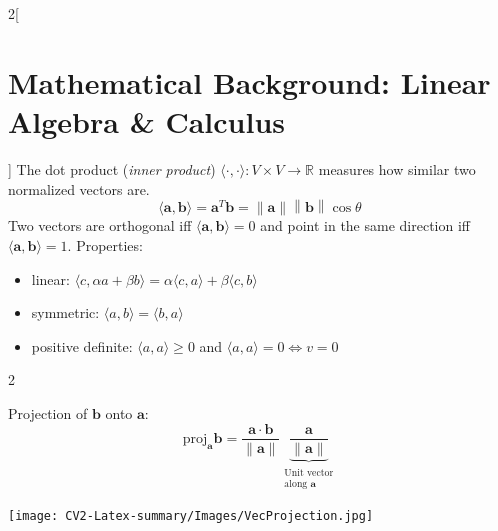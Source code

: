 \documentclass[oneside,fontsize=11pt,paper=a4]{scrartcl}
\newcommand\norm[1]{\left\lVert#1\right\rVert}
\begin{document}
\begin{multicols}{2}[\section{Mathematical Background: Linear Algebra \& Calculus}]
The dot product (\textit{inner product}) $\langle \cdot, \cdot \rangle: V \times V \rightarrow \mathbb{R}$ measures how similar two normalized vectors are.
\begin{equation*}
    \langle \mathbf{a}, \mathbf{b} \rangle = \mathbf{a}^T \mathbf
{b} = \norm{\mathbf{a}}\norm{\mathbf{b}}\cos\theta
\end{equation*}
Two vectors are orthogonal iff $\langle \mathbf{a}, \mathbf{b} \rangle = 0$ and point in the same direction iff $\langle \mathbf{a}, \mathbf{b} \rangle = 1$. Properties:
\begin{itemize}
    \setlength\itemsep{-0.1em}
	\item linear: $\langle c, \alpha a + \beta b \rangle = \alpha \langle c,a \rangle + \beta \langle c,b \rangle$ 
	\item symmetric: $\langle a,b \rangle = \langle b,a \rangle$
	\item positive definite: $\langle a, a \rangle \geq 0 $ and $ \langle a,a \rangle = 0 \iff v = 0$ 
\end{itemize}
\begin{multicols}{2}
    \begin{center}
        Projection of $\mathbf{b}$ onto $\mathbf{a}$:
        $$\text{proj}_\mathbf{a}\mathbf{b}=\frac
        {\mathbf{a}\cdot\mathbf{b}}{\norm{\mathbf{a}}}\underbrace{\frac{\mathbf{a}}{\norm{\mathbf{a}}}}_{\substack{\text{Unit vector}\\\text{along }\mathbf{a}}}$$
    \end{center}
    \hfill
    \texttt{[image: CV2-Latex-summary/Images/VecProjection.jpg]}
\end{multicols}


\end{multicols}
\end{document}
